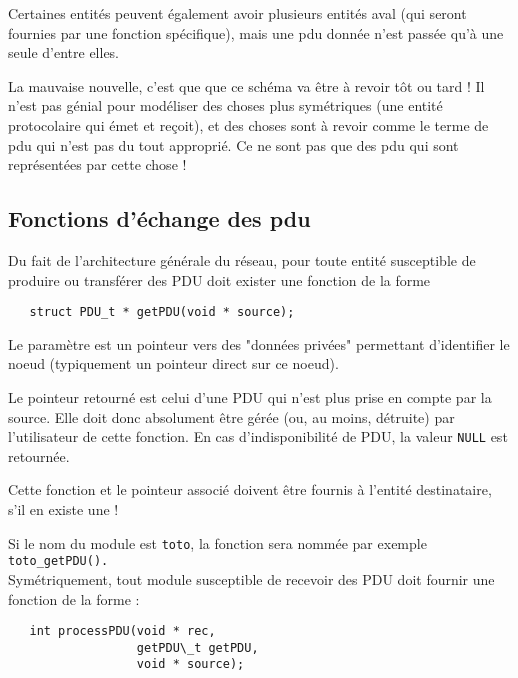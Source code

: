    Certaines entités peuvent également avoir plusieurs entités aval
(qui seront fournies par une fonction spécifique), mais une {\sc pdu}
donnée n'est passée qu'à une seule d'entre elles.

   La mauvaise nouvelle, c'est que que ce schéma va être à revoir tôt
ou tard ! Il n'est pas génial pour modéliser des choses plus
symétriques (une entité protocolaire qui émet et reçoit), et des
choses sont à revoir comme le terme de {\sc pdu} qui n'est pas du tout
approprié. Ce ne sont pas que des {\sc pdu} qui sont représentées par
cette chose !

%
\subsection{Fonctions d'échange des {\sc pdu}}

   Du fait de l'architecture générale du réseau, pour toute entité susceptible
de produire ou transférer des PDU doit exister une fonction de la forme

\begin{verbatim}
   struct PDU_t * getPDU(void * source);
\end{verbatim}

   Le paramètre est un pointeur vers des "données privées" permettant
d'identifier le noeud (typiquement un pointeur direct sur ce noeud).

   Le pointeur retourné est celui d'une PDU qui n'est plus prise en
compte par la source. Elle doit donc absolument être gérée (ou, au
moins, détruite) par l'utilisateur de cette fonction. En cas
d'indisponibilité de PDU, la valeur {\tt NULL} est retournée.

   Cette fonction et le pointeur associé doivent être fournis à
l'entité destinataire, s'il en existe une !

   Si le nom du module est {\tt toto}, la fonction sera nommée par exemple
{\tt toto\_getPDU().}\\

   Symétriquement, tout module susceptible de recevoir des PDU doit fournir une
fonction de la forme :


\begin{verbatim}
   int processPDU(void * rec,
                  getPDU\_t getPDU,
                  void * source);
\end{verbatim}

